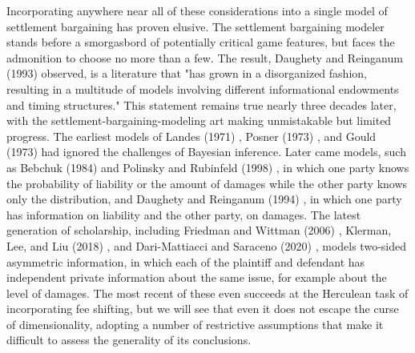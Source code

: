\documentclass{article}
\begin{document}
Incorporating anywhere near all of these considerations into a single model of settlement bargaining has proven elusive. The settlement bargaining modeler stands before a smorgasbord of potentially critical game features, but faces the admonition to choose no more than a few. The result, Daughety and Reinganum (1993) \cite{daughetyreinganum1993} observed, is a literature that "has grown in a disorganized fashion, resulting in a multitude of models involving different informational endowments and timing structures." This statement remains true nearly three decades later, with the  settlement-bargaining-modeling art making unmistakable but limited progress. The earliest models of Landes (1971) \cite{landes}, Posner (1973) \cite{posner}, and Gould (1973) \cite{gould} had ignored the challenges of Bayesian inference. Later came models, such as Bebchuk (1984) \cite{bebchuk84} and Polinsky and Rubinfeld (1998) \cite{polinskyrubinfeld}, in which one party knows the probability of liability or the amount of damages while the other party knows only the distribution, and Daughety and Reinganum (1994) \cite{daughetyreinganum1994}, in which one party has information on liability and the other party, on damages. The latest generation of scholarship, including Friedman and Wittman (2006) \cite{friedmanwittman}, Klerman, Lee, and Liu (2018) \cite{klermanleeliu}, and Dari-Mattiacci and Saraceno (2020) \cite{darimatiaccisaraceno}, models two-sided asymmetric information, in which each of the plaintiff and defendant has independent private information about the same issue, for example about the level of damages. The most recent of these even succeeds at the Herculean task of incorporating fee shifting, but we will see that even it does not escape the curse of dimensionality, adopting a number of restrictive assumptions that make it difficult to assess the generality of its conclusions.
\end{document}
